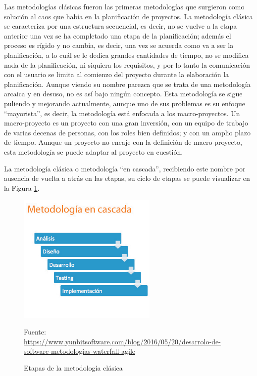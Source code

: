 Las metodologías clásicas fueron las primeras metodologías que surgieron como solución al caos que había en la planificación de proyectos. La metodología clásica se caracteriza por una estructura secuencial, es decir, no se vuelve a la etapa anterior una vez se ha completado una etapa de la planificación; además el proceso es rígido y no cambia, es decir, una vez se acuerda como va a ser la planificación, a lo cuál se le dedica grandes cantidades de tiempo, no se modifica nada de la planificación, ni siquiera los requisitos, y por lo tanto la comunicación con el usuario se limita al comienzo del proyecto durante la elaboración la planificación. Aunque viendo su nombre parezca que se trata de una metodología arcaica y en desuso, no es así bajo ningún concepto. Esta metodología se sigue puliendo y mejorando actualmente, aunque uno de sus problemas es su enfoque ``mayorista'', es decir, la metodología está enfocada a los macro-proyectos. Un macro-proyecto es un proyecto con una gran inversión, con un equipo de trabajo de varias decenas de personas, con los roles bien definidos; y con un amplio plazo de tiempo. Aunque un proyecto no encaje con la definición de macro-proyecto, esta metodología se puede adaptar al proyecto en cuestión.

La metodología clásica o metodología ``en cascada'', recibiendo este nombre por ausencia de vuelta a atrás en las etapas, su ciclo de etapas se puede visualizar en la Figura \ref{fig:etapas_clasica}.

\begin{figure}[h]
    \centering
    \includegraphics[width=0.6\textwidth]{imagenes/03_Planificacion/meto_clasica.jpg}
    \label{fig:etapas_clasica}
    \begin{center}
        Fuente: \url{https://www.yunbitsoftware.com/blog/2016/05/20/desarrolo-de-software-metodologias-waterfall-agile}
    \end{center}
    \caption{Etapas de la metodología clásica}
\end{figure}


